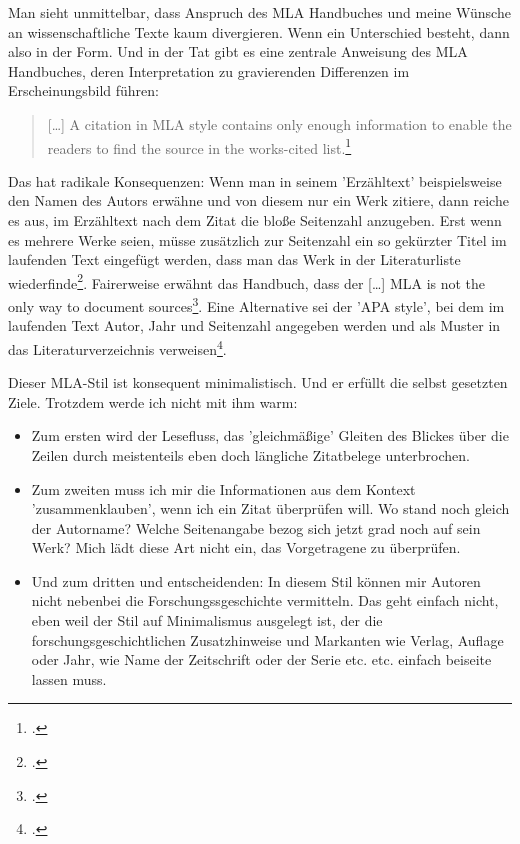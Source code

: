 Man sieht unmittelbar, dass Anspruch des MLA Handbuches und meine Wünsche an
wissenschaftliche Texte kaum divergieren. Wenn ein Unterschied besteht, dann
also in der Form. Und in der Tat gibt es eine zentrale Anweisung des MLA
Handbuches, deren Interpretation zu gravierenden Differenzen im Erscheinungsbild
führen:

\begin{quote} \glqq{}[\ldots] A citation in MLA style contains only enough
information to enable the readers to find the source in the works-cited
list.\grqq{}\footcite[][127]{ModLanAss2009a}
\end{quote}

Das hat radikale Konsequenzen: Wenn man in seinem 'Erzähltext' beispielsweise
den Namen des Autors erwähne und von diesem nur ein Werk zitiere, dann reiche es
aus, im Erzähltext nach dem Zitat die bloße Seitenzahl anzugeben. Erst wenn es
mehrere Werke seien, müsse zusätzlich zur Seitenzahl ein so gekürzter Titel im
laufenden Text eingefügt werden, dass man das Werk in der Literaturliste
wiederfinde\footcite[vgl.][127]{ModLanAss2009a}. Fairerweise erwähnt das
Handbuch, dass der \glqq{}[\ldots] MLA is not the only way to document
sources\grqq{}\footcite[vgl.][127]{ModLanAss2009a}. Eine Alternative sei der
'APA style', bei dem im laufenden Text Autor, Jahr und Seitenzahl angegeben
werden und als Muster in das Literaturverzeichnis
verweisen\footcite[vgl.][127f]{ModLanAss2009a}.

Dieser MLA-Stil ist konsequent minimalistisch. Und er erfüllt die selbst
gesetzten Ziele. Trotzdem werde ich nicht mit ihm warm:

\begin{itemize}
  \item Zum ersten wird der Lesefluss, das 'gleichmäßige' Gleiten des Blickes
  über die Zeilen durch meistenteils eben doch längliche Zitatbelege
  unterbrochen.
  \item Zum zweiten muss ich mir die Informationen aus dem Kontext
  'zusammenklauben', wenn ich ein Zitat überprüfen will. Wo stand noch gleich
  der Autorname? Welche Seitenangabe bezog sich jetzt grad noch auf sein Werk?
  Mich lädt diese Art nicht ein, das Vorgetragene zu überprüfen.
  \item Und zum dritten und entscheidenden: In diesem Stil können mir Autoren
  nicht nebenbei die Forschungssgeschichte vermitteln. Das geht einfach nicht,
  eben weil der Stil auf Minimalismus ausgelegt ist, der die
  forschungsgeschichtlichen Zusatzhinweise und Markanten wie Verlag, Auflage
  oder Jahr, wie Name der Zeitschrift oder der Serie etc. etc. einfach beiseite
  lassen muss.
\end{itemize}

